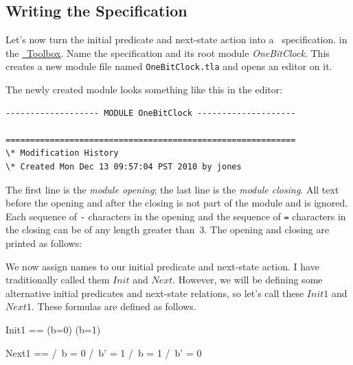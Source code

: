 \documentclass[fleqn,leqno]{article}
\begin{document}
\subsection{Writing the Specification}

Let's now turn the initial predicate and next-state action into a
\tlaplus\ specification.  
in the 
 \hyperref{http://research.microsoft.com/en-us/um/people/lamport/tla/toolbox.html}{}{}{\protect\tlaplus\
Toolbox}.
Name the specification and
its root module \emph{OneBitClock}.  This creates a new module file
named \texttt{OneBitClock.tla} and opens an editor on it.

The newly created module looks something like this in the editor:
\begin{display}
\begin{verbatim}
------------------- MODULE OneBitClock --------------------

===========================================================
\* Modification History
\* Created Mon Dec 13 09:57:04 PST 2010 by jones
\end{verbatim}
\end{display}
The first line is the 
\emph{module opening}; the last line is the
\emph{module closing}.  All text before the opening and after the
closing is not part of the module and is ignored.  Each sequence of
\verb|-| characters in the opening and the sequence of \verb|=|
characters in the closing can be of any length greater than~3.  
The opening and closing are printed as follows:
\begin{display}
\end{display}
We now assign names to our initial predicate and next-state action.  I
have traditionally called them $Init$ and $Next$.  However, we will be
defining some alternative initial predicates and next-state relations,
so let's call these $Init1$ and $Next1$.  These formulas are defined
as follows.
\begin{display}
\begin{notla}
Init1 == (b=0) \/ (b=1)
     
Next1 == \/ /\ b = 0
            /\ b' = 1
         \/ /\ b = 1
            /\ b' = 0
\end{notla}
\begin{tlatex}
%
\par\vspace{8.0pt}%
%
%
%
%
%
\end{tlatex}
\end{display}
\end{document}
